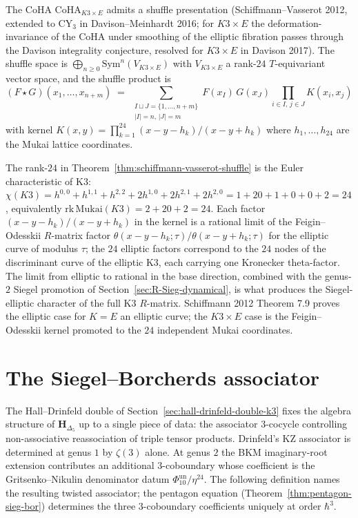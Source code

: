 \begin{theorem}
\label{thm:schiffmann-vasserot-shuffle}
The CoHA $\mathrm{CoHA}_{K3\times E}$ admits a shuffle presentation (Schiffmann--Vasserot
2012, extended to CY$_3$ in Davison--Meinhardt 2016; for $K3\times E$ the
deformation-invariance of the CoHA under smoothing of the elliptic fibration passes
through the Davison integrality conjecture, resolved for $K3\times E$ in
Davison 2017). The shuffle space is
$\bigoplus_{n\geq 0} \mathrm{Sym}^n(V_{K3\times E})$ with $V_{K3\times E}$ a rank-$24$
$T$-equivariant vector space, and the shuffle product is
\[
 (F \star G)(x_1,\dots,x_{n+m})
 \;=\;
 \sum_{\substack{I\sqcup J = \{1,\dots,n+m\}\\ |I|=n,\,|J|=m}}
 F(x_I)\,G(x_J)\prod_{i\in I,\,j\in J} K(x_i,x_j)
\]
with kernel $K(x,y)=\prod_{k=1}^{24}(x-y-h_k)/(x-y+h_k)$ where $h_1,\dots,h_{24}$ are
the Mukai lattice coordinates.
\end{theorem}

\begin{remark}
\label{rem:shuffle-elliptic-lift-FO}
The rank-$24$ in Theorem~\ref{thm:schiffmann-vasserot-shuffle} is the Euler
characteristic of K3: $\chi(K3) = h^{0,0}+h^{1,1}+h^{2,2}+2h^{1,0}+2h^{2,1}+2h^{2,0}
= 1+20+1+0+0+2 = 24$, equivalently $\mathrm{rk}\, \mathrm{Mukai}(K3) = 2 + 20 + 2 = 24$.
Each factor $(x-y-h_k)/(x-y+h_k)$ in the kernel is a rational limit of the
Feigin--Odesskii $R$-matrix factor $\theta(x-y-h_k;\tau)/\theta(x-y+h_k;\tau)$ for the
elliptic curve of modulus $\tau$; the $24$ elliptic factors correspond to the $24$
nodes of the discriminant curve of the elliptic K3, each carrying one Kronecker
theta-factor. The limit from elliptic to rational in the base direction, combined
with the genus-$2$ Siegel promotion of Section~\ref{sec:R-Sieg-dynamical}, is what
produces the Siegel-elliptic character of the full K3 $R$-matrix. Schiffmann 2012
Theorem 7.9 proves the elliptic case for $K = E$ an elliptic curve; the $K3\times E$
case is the Feigin--Odesskii kernel promoted to the $24$ independent Mukai coordinates.
\end{remark}

\section{The Siegel--Borcherds associator}
\label{sec:siegel-borcherds-associator}

The Hall--Drinfeld double of Section~\ref{sec:hall-drinfeld-double-k3} fixes the
algebra structure of $\mathbf{H}_{\Delta_5}$ up to a single piece of data:
the associator $3$-cocycle controlling non-associative reassociation of
triple tensor products. Drinfeld's KZ associator is determined at genus $1$
by $\zeta(3)$ alone. At genus $2$ the BKM imaginary-root extension contributes
an additional $3$-coboundary whose coefficient is the Gritsenko--Nikulin
denominator datum $\Phi_{10}^{\mathrm{un}}/\eta^{24}$. The following definition names the
resulting twisted associator; the pentagon equation (Theorem~\ref{thm:pentagon-sieg-bor})
determines the three $3$-coboundary coefficients uniquely at order $\hbar^3$.

